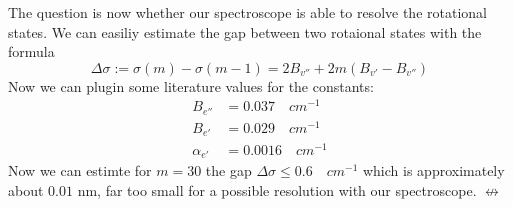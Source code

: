 The question is now whether our spectroscope is able to resolve
the rotational states. We can easiliy estimate the gap between
two rotaional states with the formula
\begin{equation}
    \Delta \sigma := \sigma(m) - \sigma(m-1) = 2 B_{v''} +
    2m(B_{v'} - B_{v''})
\end{equation}
Now we can plugin some literature values for the constants:
\begin{align}
    B_{e''} &= 0.037 \quad  cm^{-1} \\ 
    B_{e'}  &= 0.029 \quad cm^{-1} \\ 
    \alpha_{e'}  &= 0.0016 \quad cm^{-1}
\end{align}
Now we can estimte for $m=30$ the gap
$\Delta \sigma \leqslant 0.6 \quad cm^{-1}$ which is 
approximately about $0.01$ nm, far too small for a possible
resolution with our spectroscope.
$\nleftrightarrow$
